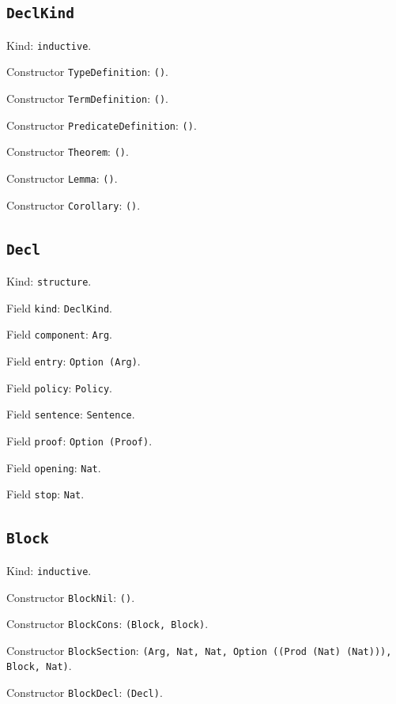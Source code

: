 \documentclass[11pt]{article}
\begin{document}
\subsection*{\texttt{DeclKind}}
\noindent Kind: \texttt{inductive}.\par
\noindent Constructor \texttt{TypeDefinition}: \texttt{()}.\par
\noindent Constructor \texttt{TermDefinition}: \texttt{()}.\par
\noindent Constructor \texttt{PredicateDefinition}: \texttt{()}.\par
\noindent Constructor \texttt{Theorem}: \texttt{()}.\par
\noindent Constructor \texttt{Lemma}: \texttt{()}.\par
\noindent Constructor \texttt{Corollary}: \texttt{()}.\par
\subsection*{\texttt{Decl}}
\noindent Kind: \texttt{structure}.\par
\noindent Field \texttt{kind}: \texttt{DeclKind}.\par
\noindent Field \texttt{component}: \texttt{Arg}.\par
\noindent Field \texttt{entry}: \texttt{Option (Arg)}.\par
\noindent Field \texttt{policy}: \texttt{Policy}.\par
\noindent Field \texttt{sentence}: \texttt{Sentence}.\par
\noindent Field \texttt{proof}: \texttt{Option (Proof)}.\par
\noindent Field \texttt{opening}: \texttt{Nat}.\par
\noindent Field \texttt{stop}: \texttt{Nat}.\par
\subsection*{\texttt{Block}}
\noindent Kind: \texttt{inductive}.\par
\noindent Constructor \texttt{BlockNil}: \texttt{()}.\par
\noindent Constructor \texttt{BlockCons}: \texttt{(Block, Block)}.\par
\noindent Constructor \texttt{BlockSection}: \texttt{(Arg, Nat, Nat, Option ((Prod (Nat) (Nat))), Block, Nat)}.\par
\noindent Constructor \texttt{BlockDecl}: \texttt{(Decl)}.\par
\end{document}
